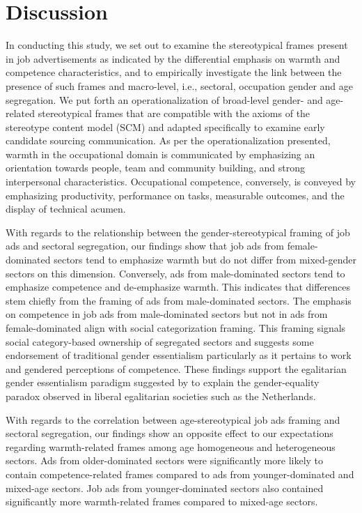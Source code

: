 \documentclass[man]{apa7}
\begin{document}
\section{Discussion}
\label{discussion}
In conducting this study, we set out to examine the stereotypical frames present in job advertisements as indicated by the differential emphasis on warmth and competence characteristics, and to empirically investigate the link between the presence of such frames and macro-level, i.e., sectoral, occupation gender and age segregation. We put forth an operationalization of broad-level gender- and age-related stereotypical frames that are compatible with the axioms of the stereotype content model (SCM) and adapted specifically to examine early candidate sourcing communication. As per the operationalization presented, warmth in the occupational domain is communicated by emphasizing an orientation towards people, team and community building, and strong interpersonal characteristics. Occupational competence, conversely, is conveyed by emphasizing productivity, performance on tasks, measurable outcomes, and the display of technical acumen.

With regards to the relationship between the gender-stereotypical framing of job ads and sectoral segregation, our findings show that job ads from female-dominated sectors tend to emphasize warmth but do not differ from mixed-gender sectors on this dimension. Conversely, ads from male-dominated sectors tend to emphasize competence and de-emphasize warmth. This indicates that differences stem chiefly from the framing of ads from male-dominated sectors. The emphasis on competence in job ads from male-dominated sectors but not in ads from female-dominated align with social categorization framing. This framing signals social category-based ownership of segregated sectors and suggests some endorsement of traditional gender essentialism particularly as it pertains to work and gendered perceptions of competence. These findings support the egalitarian gender essentialism paradigm suggested by \Textcite{cotter_end_2011} to explain the gender-equality paradox observed in liberal egalitarian societies such as the Netherlands.

With regards to the correlation between age-stereotypical job ads framing and sectoral segregation, our findings show an opposite effect to our expectations regarding warmth-related frames among age homogeneous and heterogeneous sectors. Ads from older-dominated sectors were significantly more likely to contain competence-related frames compared to ads from younger-dominated and mixed-age sectors. Job ads from younger-dominated sectors also contained significantly more warmth-related frames compared to mixed-age sectors.
\end{document}
